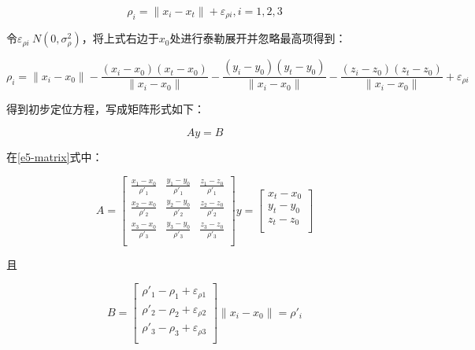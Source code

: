 \begin{equation}
    \rho_i = \|x_i - x_t\| + \varepsilon_{\rho i}, i=1,2,3
\end{equation}

令$\varepsilon_{\rho i}~N(0, \sigma_\rho^2)$，将上式右边于$x_0$处进行泰勒展开并忽略最高项得到：

\begin{equation}
    \rho_i = \|x_i-x_0\|
    - \frac{(x_i-x_0)(x_t-x_0)}{\|x_i-x_0\|}
    - \frac{(y_i-y_0)(y_t-y_0)}{\|x_i-x_0\|}
    - \frac{(z_i-z_0)(z_t-z_0)}{\|x_i-x_0\|}
    + \varepsilon_{\rho i}
\end{equation}

得到初步定位方程，写成矩阵形式如下：

\begin{equation}
    Ay=B
    \label{e5-matrix}
\end{equation}

在\eqref{e5-matrix}式中：

\begin{equation}
    A=
    \left[
    \begin{matrix}
        \frac{x_1-x_0}{\rho'_1} & \frac{y_1-y_0}{\rho'_1} & \frac{z_1-z_0}{\rho'_1} \\

        \frac{x_2-x_0}{\rho'_2} & \frac{y_2-y_0}{\rho'_2} & \frac{z_2-z_0}{\rho'_2} \\
        
        \frac{x_3-x_0}{\rho'_3} & \frac{y_3-y_0}{\rho'_3} & \frac{z_3-z_0}{\rho'_3} \\
    \end{matrix}
    \right]
    y=
    \left[
        \begin{matrix}
            x_t - x_0   \\
            y_t - y_0   \\
            z_t - z_0   \\
        \end{matrix}
    \right]
\end{equation}

且

\begin{equation}
    B=
    \left[
        \begin{matrix}
            \rho'_1-\rho_1+\varepsilon_{\rho1} \\
            \rho'_2-\rho_2+\varepsilon_{\rho2} \\
            \rho'_3-\rho_3+\varepsilon_{\rho3} \\
        \end{matrix}
    \right]
    \|x_i - x_0\| = \rho'_i
\end{equation}

